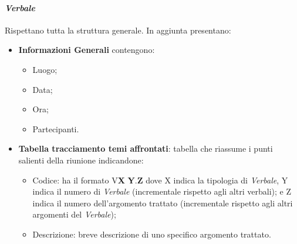 \paragraph{\textit{Verbale}}
Rispettano tutta la struttura generale.
In aggiunta presentano:
\begin{itemize} 
    \item \textbf{Informazioni Generali}
    contengono:
    \begin{itemize} 
        \item Luogo;
        \item Data;
        \item Ora;
        \item Partecipanti.
    \end{itemize}
\item \textbf{Tabella tracciamento temi affrontati}:
tabella che riassume i punti salienti della riunione indicandone:
    \begin{itemize} 
        \item Codice: ha il formato V\textbf{X} \textbf{Y}.\textbf{Z} dove X indica la tipologia di \textit{Verbale}, Y indica il numero di \textit{Verbale} (incrementale rispetto agli altri verbali);
        e Z indica il numero dell'argomento trattato (incrementale rispetto agli altri argomenti del \textit{Verbale});
        \item Descrizione: breve descrizione di uno specifico argomento trattato.
    \end{itemize}

\end{itemize}